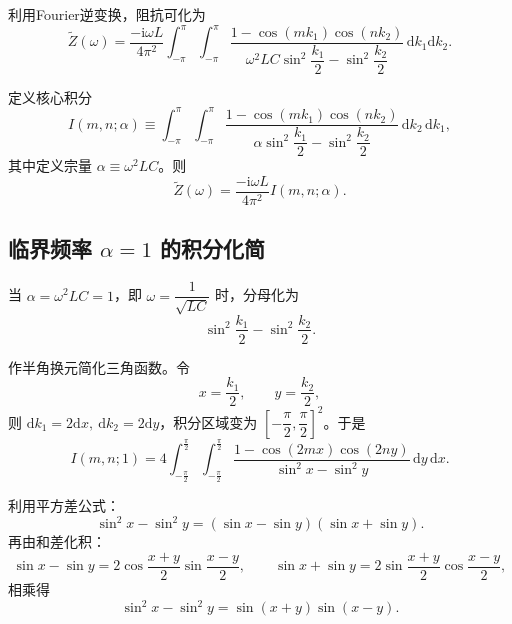 \documentclass{article} %
\newcommand{\di}{\mathrm{d}}
\newcommand{\ii}{\mathrm{i}}
\begin{document}
利用Fourier逆变换，阻抗可化为
\begin{equation}
  \widetilde{Z}(\omega)=
  \dfrac{-\ii\omega L}{4\pi^2}
  \int_{-\pi}^{\pi}\int_{-\pi}^{\pi}
  \dfrac{1-\cos(mk_1)\cos(nk_2)}
  {\omega^2 LC\sin^2\dfrac{k_1}{2}-\sin^2\dfrac{k_2}{2}}
  \,\di k_1\di k_2.
\label{eq:Z_integral_2D}
\end{equation}

定义核心积分
\begin{equation}
    I(m,n;\alpha) \equiv
    \int_{-\pi}^{\pi}\int_{-\pi}^{\pi}
    \frac{1-\cos(mk_1)\cos(nk_2)}
    {\alpha\sin^2\dfrac{k_1}{2}-\sin^2\dfrac{k_2}{2}}
    \,\di k_2\,\di k_1,
    \label{eq:I_mn_definition}
\end{equation}
其中定义宗量 $\alpha \equiv \omega^2 LC$。则
\begin{equation}
    \widetilde{Z}(\omega) = \dfrac{-\ii\omega L}{4\pi^2} I(m,n;\alpha).
    \label{eq:Z_I_relation}
\end{equation}

\subsection{临界频率 $\alpha=1$ 的积分化简}


当 $\alpha = \omega^2 LC = 1$，即 $\omega = \dfrac{1}{\sqrt{LC}}$ 时，分母化为
\begin{equation}
    \sin^2\dfrac{k_1}{2}-\sin^2\dfrac{k_2}{2}.
\end{equation}

作半角换元简化三角函数。令
\begin{equation}
    x=\dfrac{k_1}{2},\qquad y=\dfrac{k_2}{2},
\end{equation}
则 $\di k_1=2\di x,\ \di k_2=2\di y$，积分区域变为 $\left[-\dfrac{\pi}{2},\dfrac{\pi}{2}\right]^2$。于是
\begin{equation}
    I(m,n;1)=4\int_{-\frac{\pi}{2}}^{\frac{\pi}{2}}\int_{-\frac{\pi}{2}}^{\frac{\pi}{2}}
    \dfrac{1-\cos(2mx)\cos(2ny)}
    {\sin^2 x-\sin^2 y}
    \,\di y\,\di x.
    \label{eq:I_half_angle}
\end{equation}

利用平方差公式：
\begin{equation}
    \sin^2 x-\sin^2 y = (\sin x-\sin y)(\sin x+\sin y).
\end{equation}
再由和差化积：
\begin{equation}
    \sin x-\sin y=2\cos\frac{x+y}{2}\sin\frac{x-y}{2},\qquad
    \sin x+\sin y=2\sin\frac{x+y}{2}\cos\frac{x-y}{2},
\end{equation}
相乘得
\begin{equation}
    \sin^2 x-\sin^2 y = \sin(x+y)\sin(x-y).
    \label{eq:sin_diff_product}
\end{equation}
\end{document}
